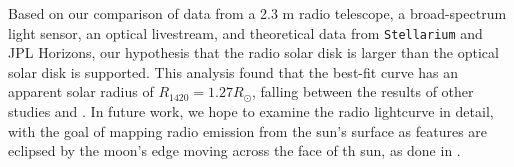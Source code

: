 Based on our comparison of data from a 2.3 m radio telescope, a broad-spectrum light sensor, an optical livestream, and theoretical data from \texttt{Stellarium} and JPL Horizons, our hypothesis that the radio solar disk is larger than the optical solar disk is supported.
This analysis found that the best-fit curve has an apparent solar radius of $R_{\mathrm{1420}} = 1.27 R_{\odot}$, falling between the results of other studies \cite{messerotti_radio_2000} and \cite{leung_solar_2022}.
In future work, we hope to examine the radio lightcurve in detail, with the goal of mapping radio emission from the sun's surface as features are eclipsed by the moon's edge moving across the face of th sun, as done in \cite{messerotti_radio_2000}.
